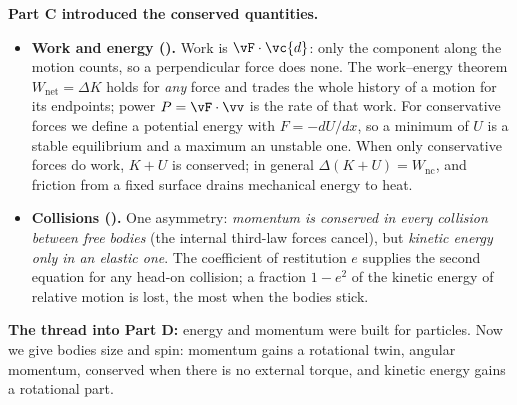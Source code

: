 \textbf{Part C introduced the conserved quantities.}
\begin{itemize}
\item \textbf{Work and energy ().} Work is $\vF\cdot\vc{d}$: only the component along the motion
counts, so a perpendicular force does none. The work--energy theorem $W_{\text{net}}=\Delta K$ holds for
\emph{any} force and trades the whole history of a motion for its endpoints; power $P=\vF\cdot\vv$ is the
rate of that work. For conservative forces we define a potential energy with $F=-dU/dx$, so a minimum of $U$
is a stable equilibrium and a maximum an unstable one. When only conservative forces do work, $K+U$ is
conserved; in general $\Delta(K+U)=W_{\text{nc}}$, and friction from a fixed surface drains mechanical energy
to heat.
\item \textbf{Collisions ().} One asymmetry: \emph{momentum is conserved in every
collision between free bodies} (the internal third-law forces cancel), but \emph{kinetic energy only in
an elastic one}. The coefficient of restitution $e$ supplies the second equation for any head-on
collision; a fraction $1-e^2$ of the kinetic energy of relative motion is lost, the most when the bodies
stick.
\end{itemize}
\textbf{The thread into Part D:} energy and momentum were built for particles. Now we give bodies size and
spin: momentum gains a rotational twin, angular momentum, conserved when there is no external torque, and
kinetic energy gains a rotational part.
